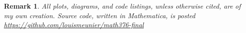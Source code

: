 \documentclass[12pt]{article}
\newtheorem{remark}{Remark}
\begin{document}
\begin{remark}
    All plots, diagrams, and code listings, unless otherwise cited, are of my own creation. Source code, written in Mathematica, is posted \hyperref[here]{https://github.com/louismeunier/math376-final}
\end{remark}
\printbibliography
\end{document}
